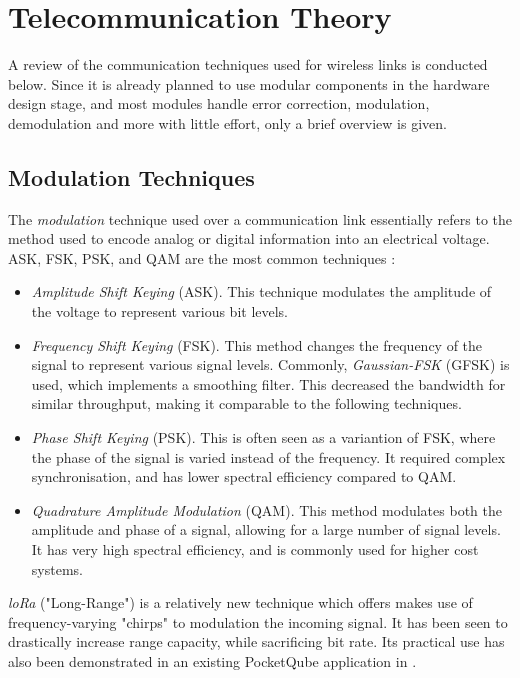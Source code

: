 \section{Telecommunication Theory}\label{sec:telecommunication_theory}
A review of the communication techniques used for wireless links is conducted below. Since it is already planned to use modular components in the hardware design stage, and most modules handle error correction, modulation, demodulation and more with little effort, only a brief overview is given.

\subsection{Modulation Techniques}
The \textit{modulation} technique used over a communication link essentially refers to the method used to encode analog or digital information into an electrical voltage. ASK, FSK, PSK, and QAM are the most common techniques \cite{site-satelliteModulationOverview} \cite{site-satelliteModulationComparison}:
\begin{itemize}
    \item \textit{Amplitude Shift Keying} (ASK). This technique modulates the amplitude of the voltage to represent various bit levels.
    \item \textit{Frequency Shift Keying} (FSK). This method changes the frequency of the signal to represent various signal levels. Commonly, \textit{Gaussian-FSK} (GFSK) is used, which implements a smoothing filter. This decreased the bandwidth for similar throughput, making it comparable to the following techniques.
    \item \textit{Phase Shift Keying} (PSK). This is often seen as a variantion of FSK, where the phase of the signal is varied instead of the frequency. It required complex synchronisation, and has lower spectral efficiency compared to QAM.
    \item \textit{Quadrature Amplitude Modulation} (QAM). This method modulates both the amplitude and phase of a signal, allowing for a large number of signal levels. It has very high spectral efficiency, and is commonly used for higher cost systems.
\end{itemize}

\textit{loRa} ("Long-Range") is a relatively new technique which offers makes use of frequency-varying "chirps" to modulation the incoming signal. It has been seen to drastically increase range capacity, while sacrificing bit rate. Its practical use has also been demonstrated in an existing PocketQube application in \cite{design-FOSSASATLink}.

